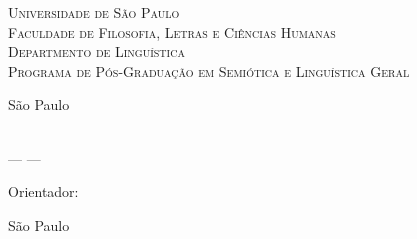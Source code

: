 \pagestyle{empty}


\sffamily
\begin{center}

\textsc{Universidade de São Paulo} \\
\textsc{Faculdade de Filosofia, Letras e Ciências Humanas} \\
\textsc{Departmento de Linguística} \\
\textsc{Programa de Pós-Graduação em Semiótica e Linguística Geral} \\

\vspace{0.2\textheight}
\large
\Autor

\bigskip\bigskip
{\Large \bfseries
}

\vfill

{\normalsize 
São Paulo\\
}

\end{center}
\clearpage




\begin{center}
{\large \lsstyle \MakeUppercase{\Autor}}

\vspace{0.2\textheight}
{\Large \bfseries
   \\
}
\normalsize
\bigskip
--- \Versao ---

\vspace{0.2\textheight}
\begin{flushright}
\begin{minipage}{0.6\textwidth}

    \bigskip
    Orientador: \DoutorOuDoutora \Orientador
\end{minipage}
\end{flushright}

\vfill
São Paulo\\

\end{center} 
\clearpage